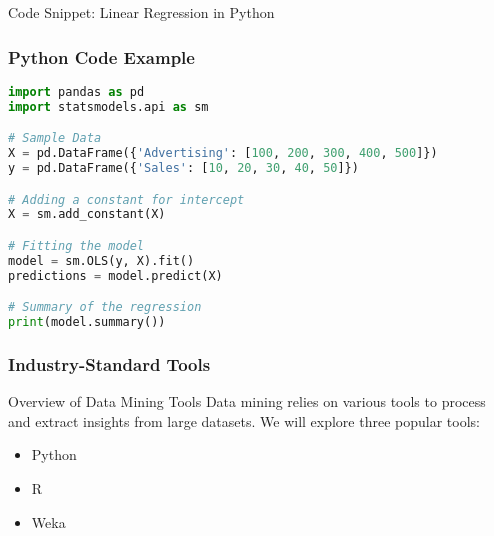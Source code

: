 \documentclass[aspectratio=169]{beamer}
\begin{document}
\begin{frame}[fragile]{Code Snippet: Linear Regression in Python}
    \frametitle{Python Code Example}
    \begin{lstlisting}[language=Python]
import pandas as pd
import statsmodels.api as sm

# Sample Data
X = pd.DataFrame({'Advertising': [100, 200, 300, 400, 500]})
y = pd.DataFrame({'Sales': [10, 20, 30, 40, 50]})

# Adding a constant for intercept
X = sm.add_constant(X)

# Fitting the model
model = sm.OLS(y, X).fit()
predictions = model.predict(X)

# Summary of the regression
print(model.summary())
    \end{lstlisting}
\end{frame}

\begin{frame}
    \frametitle{Industry-Standard Tools}
    \begin{block}{Overview of Data Mining Tools}
        Data mining relies on various tools to process and extract insights from large datasets. We will explore three popular tools: 
        \begin{itemize}
            \item Python
            \item R
            \item Weka
        \end{itemize}
    \end{block}
\end{frame}
\end{document}
